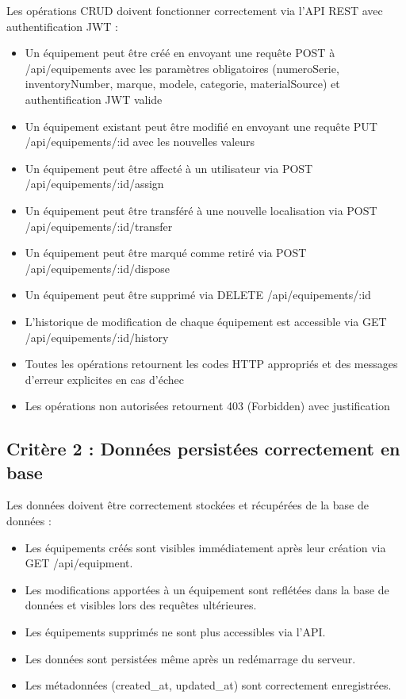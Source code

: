 Les opérations CRUD doivent fonctionner correctement via l'API REST avec authentification JWT :
\begin{itemize}
    \item Un équipement peut être créé en envoyant une requête POST à /api/equipements avec les paramètres obligatoires (numeroSerie, inventoryNumber, marque, modele, categorie, materialSource) et authentification JWT valide
    \item Un équipement existant peut être modifié en envoyant une requête PUT /api/equipements/:id avec les nouvelles valeurs
    \item Un équipement peut être affecté à un utilisateur via POST /api/equipements/:id/assign
    \item Un équipement peut être transféré à une nouvelle localisation via POST /api/equipements/:id/transfer
    \item Un équipement peut être marqué comme retiré via POST /api/equipements/:id/dispose
    \item Un équipement peut être supprimé via DELETE /api/equipements/:id
    \item L'historique de modification de chaque équipement est accessible via GET /api/equipements/:id/history
    \item Toutes les opérations retournent les codes HTTP appropriés et des messages d'erreur explicites en cas d'échec
    \item Les opérations non autorisées retournent 403 (Forbidden) avec justification
\end{itemize}

\subsection*{Critère 2 : Données persistées correctement en base}

Les données doivent être correctement stockées et récupérées de la base de données :
\begin{itemize}
    \item Les équipements créés sont visibles immédiatement après leur création via GET /api/equipment.
    \item Les modifications apportées à un équipement sont reflétées dans la base de données et visibles lors des requêtes ultérieures.
    \item Les équipements supprimés ne sont plus accessibles via l'API.
    \item Les données sont persistées même après un redémarrage du serveur.
    \item Les métadonnées (created\_at, updated\_at) sont correctement enregistrées.
\end{itemize}

